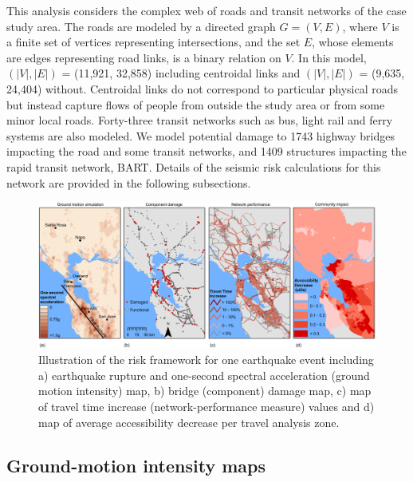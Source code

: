 This analysis considers the complex web of roads and transit networks of the case study area. The roads are modeled by a directed graph $G = (V, E)$, where $V$ is a finite set of vertices representing intersections, and the set $E$, whose elements are edges representing road links, is a binary relation on $V$. In this model, $(|V|, |E|)$ = (11,921, 32,858) including centroidal links and $(|V|, |E|)$ = (9,635, 24,404) without. Centroidal links do not correspond to particular physical roads but instead capture flows of people from outside the study area or from some minor local roads. Forty-three transit networks such as bus, light rail and ferry systems are also modeled. We  model potential damage to 1743 highway bridges impacting the road and some transit networks, and 1409 structures impacting the rapid transit network, BART. Details of the seismic risk calculations for this network are provided in the following subsections.
%


\begin{figure}
\centering
\includegraphics[width=\textwidth]{FIGS/Mahalia_four_pannels204v5_cropped.pdf} %
\caption{Illustration of the risk framework for one earthquake event including a) earthquake rupture and one-second spectral acceleration (ground motion intensity) map, b) bridge (component) damage map, c) map of travel time increase (network-performance measure) values and d) map of average accessibility decrease per travel analysis zone.}
\label{fig:four_steps}\end{figure}

\subsection{Ground-motion intensity maps}
